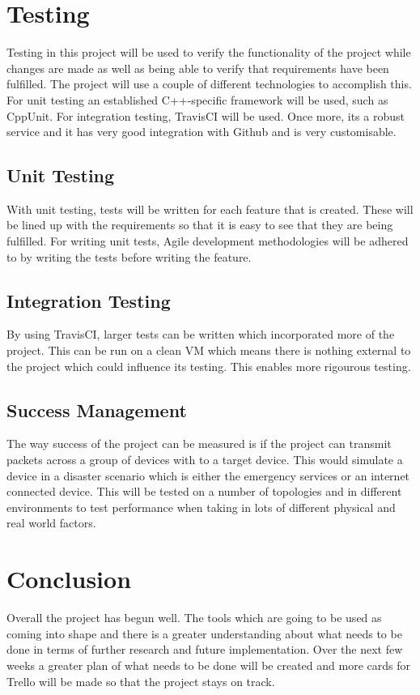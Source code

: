\documentclass{report}
\begin{document}
\chapter*{Testing}

Testing in this project will be used to verify the functionality of the project while changes are made as 
well as being able to verify that requirements have been fulfilled. The project will use a couple of different 
technologies to accomplish this. For unit testing an established C++-specific framework will be used, such 
as CppUnit.
For integration testing, TravisCI will be used. Once more, its a robust service and it has very good integration with Github and 
is very customisable. 

\section*{Unit Testing}

With unit testing, tests will be written for each feature that is created. These will be lined up with the requirements so that 
it is easy to see that they are being fulfilled. For writing unit tests, Agile development methodologies will be adhered to by 
writing the tests before writing the feature. 

\section*{Integration Testing}

By using TravisCI, larger tests can be written which incorporated more of the project. This can be run on a clean VM which 
means there is nothing external to the project which could influence its testing. This enables more rigourous testing. 

\section*{Success Management}

The way success of the project can be measured is if the project can transmit packets across a group of devices with to a 
target device. This would simulate a device in a disaster scenario which is either the emergency services or an internet 
connected device. This will be tested on a number of topologies and in different environments to test performance when taking 
in lots of different physical and real world factors.


\chapter*{Conclusion}

Overall the project has begun well. The tools which are going to be used as coming into shape and there is a greater 
understanding about what needs to be done in terms of further research and future implementation. Over the next few 
weeks a greater plan of what needs to be done will be created and more cards for Trello will be made so that the 
project stays on track.


{}

\end{document}
